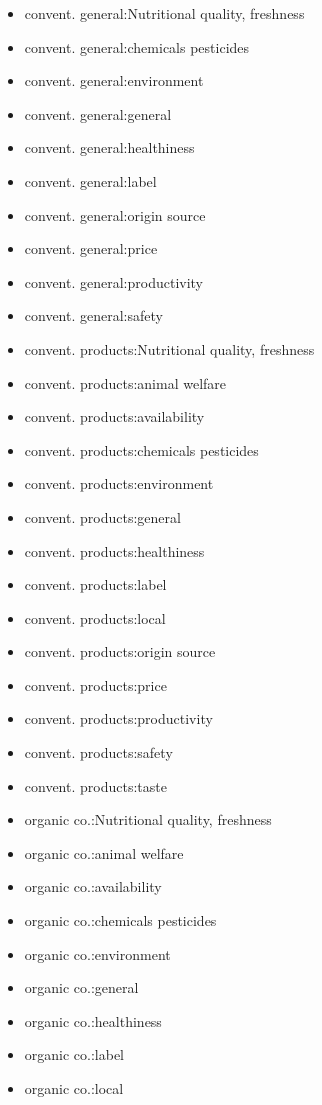 \begin{multicols}{2}
\begin{itemize}[leftmargin=*]
		\item[] convent. general:Nutritional quality, freshness 
		\item[] convent. general:chemicals pesticides 
		\item[] convent. general:environment
		\item[] convent. general:general
		\item[] convent. general:healthiness
		\item[] convent. general:label 
		\item[] convent. general:origin source 
		\item[] convent. general:price 
		\item[] convent. general:productivity 
		\item[] convent. general:safety
		\item[] convent. products:Nutritional quality, freshness
		\item[] convent. products:animal welfare
		\item[] convent. products:availability 
		\item[] convent. products:chemicals pesticides 
		\item[] convent. products:environment 
		\item[] convent. products:general 
		\item[] convent. products:healthiness 
		\item[] convent. products:label
		\item[] convent. products:local
		\item[] convent. products:origin source
		\item[] convent. products:price
		\item[] convent. products:productivity 
		\item[] convent. products:safety
		\item[] convent. products:taste
		\item[] organic co.:Nutritional quality, freshness
		\item[] organic co.:animal welfare
		\item[] organic co.:availability 
		\item[] organic co.:chemicals pesticides 
		\item[] organic co.:environment 
		\item[] organic co.:general 
		\item[] organic co.:healthiness 
		\item[] organic co.:label
		\item[] organic co.:local

\end{itemize}
\end{multicols}
